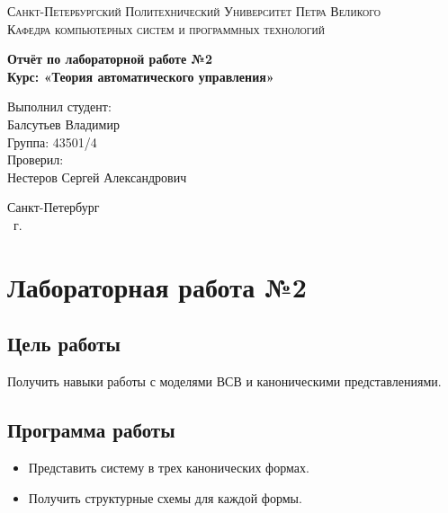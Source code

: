 \documentclass[14pt,a4paper,report]{report}
\begin{document}
\def\contentsname{Содержание}

\begin{titlepage}
	\begin{center}
		\textsc{Санкт-Петербургский Политехнический 
			Университет Петра Великого\\[5mm]
			Кафедра компьютерных систем и программных технологий}
		
		\vfill
		
		\textbf{Отчёт по лабораторной работе №2\\[3mm]
			Курс: «Теория автоматического управления»\\[3mm]
			}
	\end{center}
	
	\hfill
	\begin{minipage}{.5\textwidth}
		Выполнил студент:\\[2mm] 
		Балсутьев Владимир\\
		Группа: 43501/4\\[5mm]
		
		Проверил:\\[2mm] 
		Нестеров Сергей Александрович
	\end{minipage}
	\vfill
	\begin{center}
		Санкт-Петербург\\ \the\year\ г.
	\end{center}
\end{titlepage}

\tableofcontents
\clearpage

\chapter{Лабораторная работа №2}

\section{Цель работы}

Получить навыки работы с моделями ВСВ и каноническими представлениями.

\section{Программа работы}

\begin{itemize}
	\item Представить систему в трех канонических формах.
	\item Получить структурные схемы для каждой формы.
\end{itemize}
\end{document}
